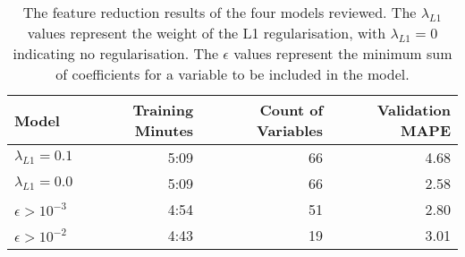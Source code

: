 \begin{table}[H]
\centering
\begin{tabular}{lrrr}
\toprule
Model & Training Minutes & Count of Variables & Validation MAPE \\
\midrule
$\lambda_{L1}=0.1$ & 5:09 & 66 & 4.68 \\
$\lambda_{L1}=0.0$ & 5:09 & 66 & 2.58 \\
$\epsilon>10^{-3}$ & 4:54 & 51 & 2.80 \\
$\epsilon>10^{-2}$ & 4:43 & 19 & 3.01 \\
\bottomrule
\end{tabular}
\caption{The feature reduction results of the four models reviewed. The $\lambda_{L1}$ values represent the weight of the L1 regularisation, with $\lambda_{L1}=0$ indicating no regularisation. The $\epsilon$ values represent the minimum sum of coefficients for a variable to be included in the model.}
\label{feat-red}
\end{table}

